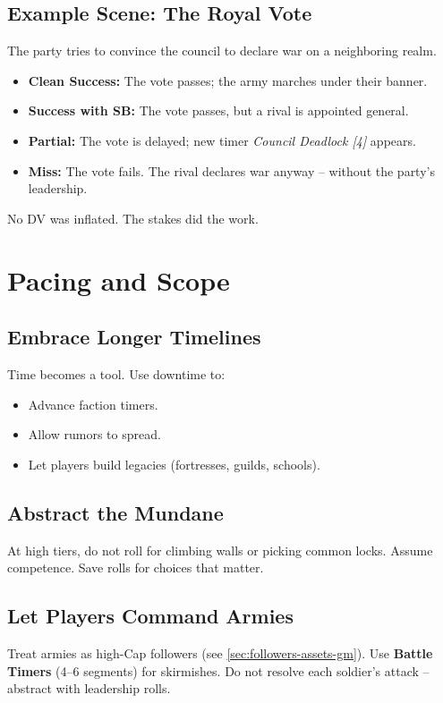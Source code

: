 \subsection*{Example Scene: The Royal Vote}
The party tries to convince the council to declare war on a neighboring realm.
\begin{itemize}
  \item \textbf{Clean Success:} The vote passes; the army marches under their banner.
  \item \textbf{Success with SB:} The vote passes, but a rival is appointed general.
  \item \textbf{Partial:} The vote is delayed; new timer \emph{Council Deadlock [4]} appears.
  \item \textbf{Miss:} The vote fails. The rival declares war anyway -- without the party's leadership.
\end{itemize}
No DV was inflated. The stakes did the work.

\section{Pacing and Scope}

\subsection*{Embrace Longer Timelines}
Time becomes a tool. Use downtime to:
\begin{itemize}
  \item Advance faction timers.
  \item Allow rumors to spread.
  \item Let players build legacies (fortresses, guilds, schools).
\end{itemize}

\subsection*{Abstract the Mundane}
At high tiers, do not roll for climbing walls or picking common locks. Assume competence. Save rolls for choices that matter.

\subsection*{Let Players Command Armies}
Treat armies as high-Cap followers (see \ref{sec:followers-assets-gm}). Use \textbf{Battle Timers} (4--6 segments) for skirmishes. Do not resolve each soldier's attack -- abstract with leadership rolls.

